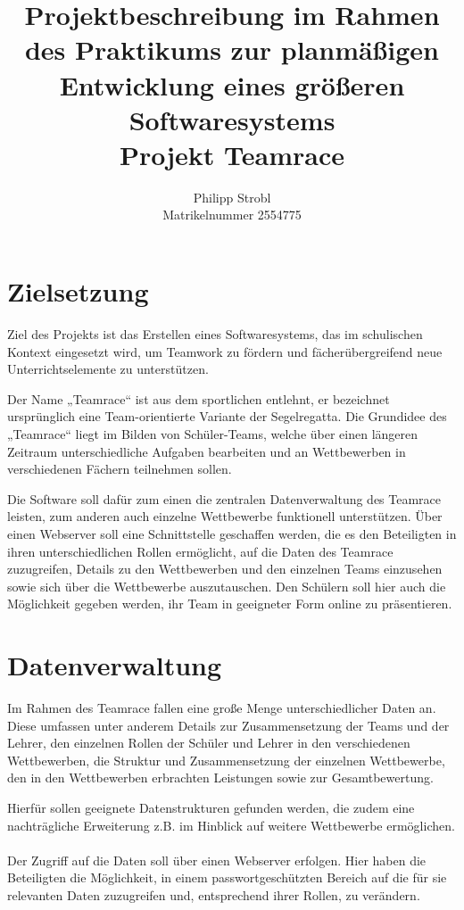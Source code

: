 \documentclass[11pt]{article}
\title{Projektbeschreibung im Rahmen des
Praktikums zur planmäßigen Entwicklung eines größeren Softwaresystems\bigskip\\
\large Projekt Teamrace}
\author{Philipp Strobl\\Matrikelnummer 2554775}
\date{}
\begin{document}
\maketitle

\section{Zielsetzung}

Ziel des Projekts ist das Erstellen eines Softwaresystems, das im schulischen Kontext eingesetzt wird, um Teamwork zu fördern und fächerübergreifend neue Unterrichtselemente zu unterstützen.

Der Name „Teamrace“ ist aus dem sportlichen entlehnt, er bezeichnet ursprünglich eine Team-orientierte Variante der Segelregatta. 
\cite{teamrace} Die Grundidee des „Teamrace“ liegt im Bilden von Schüler-Teams, welche über einen längeren Zeitraum unterschiedliche Aufgaben bearbeiten und an Wettbewerben in verschiedenen Fächern teilnehmen sollen.

Die Software soll dafür zum einen die zentralen Datenverwaltung des Teamrace leisten, zum anderen auch einzelne Wettbewerbe funktionell unterstützen.
Über einen Webserver soll eine Schnittstelle geschaffen werden, die es den Beteiligten in ihren unterschiedlichen Rollen ermöglicht, auf die Daten des Teamrace zuzugreifen, Details zu den Wettbewerben und den einzelnen Teams einzusehen sowie sich über die Wettbewerbe auszutauschen. Den Schülern soll hier auch die Möglichkeit gegeben werden, ihr Team in geeigneter Form online zu präsentieren.

\section{Datenverwaltung}

Im Rahmen des Teamrace fallen eine große Menge unterschiedlicher Daten an. Diese umfassen unter anderem Details zur Zusammensetzung der Teams und der Lehrer, den einzelnen Rollen der Schüler und Lehrer in den verschiedenen Wettbewerben, die Struktur und Zusammensetzung der einzelnen Wettbewerbe, den in den Wettbewerben erbrachten Leistungen sowie zur Gesamtbewertung.

Hierfür sollen geeignete Datenstrukturen gefunden werden, die zudem eine nachträgliche Erweiterung z.B. im Hinblick auf weitere Wettbewerbe ermöglichen.
\\\\
Der Zugriff auf die Daten soll über einen Webserver erfolgen. Hier haben die Beteiligten die Möglichkeit, in einem passwortgeschützten Bereich auf die für sie relevanten Daten zuzugreifen und, entsprechend ihrer Rollen, zu verändern.
\end{document}
